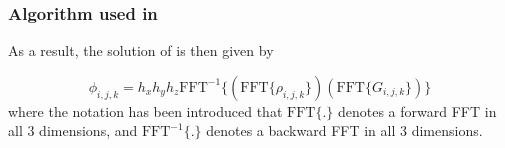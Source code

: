 \subsubsection{Algorithm used in \opal}

As a result, the solution of  is then given by

\begin{equation}
\phi_{i,j,k}=h_x h_y h_z \text{FFT}^{-1} \{ ( \text{FFT}\{\rho_{i,j,k}\}) ( \text{FFT}\{G_{i,j,k}\}) \}
\label{eq:oneterm}
\end{equation}
where the notation has been introduced that $\text{FFT}\{ . \}$ denotes a forward FFT in all 3 dimensions,
and $\text{FFT}^{-1}\{ . \}$  denotes a backward FFT in all 3 dimensions.



